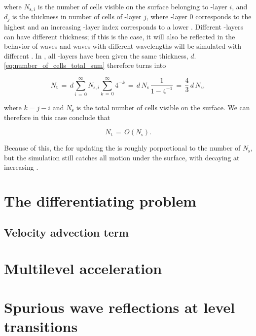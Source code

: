 where $N_{\text{s},i}$ is the number of cells visible on the surface belonging to \LOD-layer $i$, and $d_j$ is the thickness in number of cells of \LOD-layer $j$, where \LOD-layer $0$ corresponds to the highest \LOD and an increasing \LOD-layer index corresponds to a lower \LOD. Different \LOD-layers can have different thickness; if this is the case, it will also be reflected in the behavior of waves and waves with different wavelengths will be simulated with different \accuracy. In \thiswork, all \LOD-layers have been given the same thickness, $d$. \eqref{eq:number_of_cells_total_sum} therefore turns into

\begin{equation} \label{eq:number_of_cells_total}
N_{\text{t}} \,=\, d\sum_{i\,=\,0}^\infty N_{\text{s},i}\sum_{k\,=\,0}^\infty 4^{-k} \,=\, d\,N_{\text{s}}\,\frac{1}{1-4^{-1}} \,=\, \frac{4}{3}\,d\,N_{\text{s}},
\end{equation}

where $k = j-i$ and $N_{\text{s}}$ is the total number of cells visible on the surface. We can therefore in this case conclude that

\begin{equation} \label{eq:number_of_cells_total_ordo}
N_{\text{t}} \,=\, O(N_{\text{s}}).
\end{equation}

Because of this, the  for updating the  is roughly porportional to the number of  $N_{\text{s}}$, but the simulation still catches all motion under the surface, with decaying \precision at increasing \depths.

\section{The differentiating problem}

\subsection{Velocity advection term}

\section{Multilevel acceleration}

\section{Spurious wave reflections at level transitions}